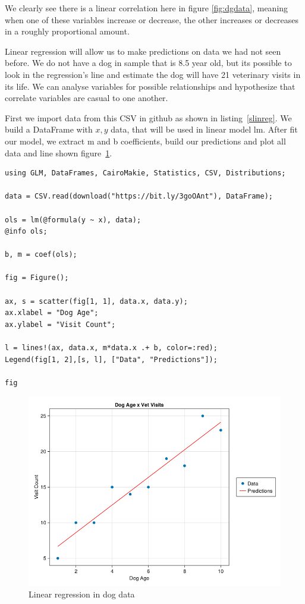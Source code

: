 \documentclass[a4paper, 11pt]{article}
\begin{document}
We clearly see there is a linear correlation here in figure \ref{fig:dgdata}, meaning when one of these variables increase or decrease, the other increases or decreases in a roughly proportional amount.

Linear regression will allow us to make predictions on data we had not seen before. We do not have a dog in sample that is 8.5 year old, but its possible to look in the regression's line and estimate the dog will have 21 veterinary visits in its life. We can analyse variables for possible relationships and hypothesize that correlate variables are casual to one another.

First we import data from this CSV in github as shown in listing~\ref{slinreg}. We build a DataFrame with $x, y$ data, that will be used in linear model lm. After fit our model, we extract m and b coefficients, build our predictions and plot all data and line shown figure~\ref{fig:linearreg}.

\begin{lstlisting}[caption={Simple Linear Regression},label=slinreg]
using GLM, DataFrames, CairoMakie, Statistics, CSV, Distributions;

data = CSV.read(download("https://bit.ly/3goOAnt"), DataFrame);

ols = lm(@formula(y ~ x), data);
@info ols;

b, m = coef(ols);

fig = Figure();

ax, s = scatter(fig[1, 1], data.x, data.y);
ax.xlabel = "Dog Age";
ax.ylabel = "Visit Count";

l = lines!(ax, data.x, m*data.x .+ b, color=:red);
Legend(fig[1, 2],[s, l], ["Data", "Predictions"]);

fig
\end{lstlisting}


\begin{figure}[ht]
\caption{Linear regression in dog data }
\label{fig:linearreg}
\includegraphics[width=.5\textwidth]{glmlinearr}
\centering
\end{figure}
\end{document}
